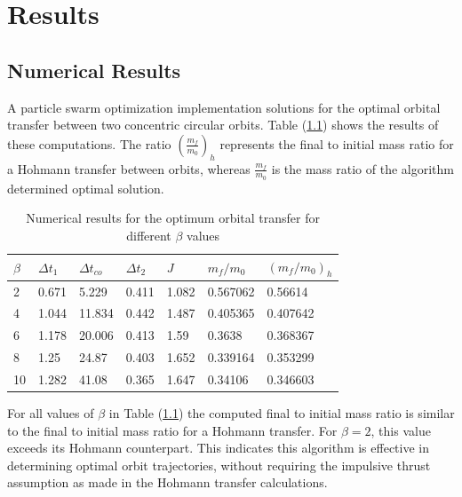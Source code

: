 \chapter{Results}


\section{Numerical Results}

\noindent A particle swarm optimization implementation solutions for the optimal orbital transfer between two concentric circular orbits. Table (\ref{tab:Numerical-Results}) shows
the results of these computations. The ratio $(\frac{m_f}{m_{0}})_h$ represents the final to initial mass
ratio for a Hohmann transfer between orbits, whereas $\frac{m_f}{m_0}$ is the mass ratio of the algorithm 
determined optimal solution.


\begin{table}[H]
  \centering
  \begin{tabular}{@{}lllllll@{}}
  \toprule
  $\beta$ & $\Delta t_1$ & $\Delta t_{co}$ & $\Delta t_2$ & $J$ & $m_f/m_0$ & $(m_f/m_0)_h$ \\ \midrule
  2 & 0.671 & 5.229 & 0.411 & 1.082 & 0.567062 & 0.56614 \\
  4 & 1.044 & 11.834 & 0.442 & 1.487 & 0.405365 & 0.407642 \\
  6 & 1.178 & 20.006 & 0.413 & 1.59 & 0.3638 & 0.368367 \\
  8 & 1.25 & 24.87 & 0.403 & 1.652 & 0.339164 & 0.353299 \\
  10 & 1.282 & 41.08 & 0.365 & 1.647 & 0.34106 & 0.346603 \\ \bottomrule
  \end{tabular}
  \caption{Numerical results for the optimum orbital transfer for different $\beta$ values }
  \label{tab:Numerical-Results}
  \end{table}

\noindent For all values of $\beta$ in Table (\ref{tab:Numerical-Results}) the computed final to initial mass ratio is similar to the final to 
initial mass ratio for a Hohmann transfer. For $\beta = 2$, this value exceeds its Hohmann
counterpart. This indicates this algorithm is effective in determining optimal orbit trajectories, without
requiring the impulsive thrust assumption as made in the Hohmann transfer calculations.

